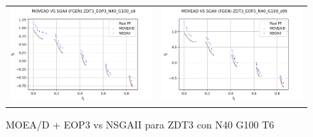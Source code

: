 \begin{figure}[H]
\begin{tabular}{c c}
    \includegraphics[scale=0.5]{figures/ZDT3_EOP3_N40_G100_T6/s9_comp.png} &
    \includegraphics[scale=0.5]{figures/ZDT3_EOP3_N40_G100_T6/s99_comp.png}\\
    \end{tabular}
    \caption{\centering MOEA/D + EOP3 vs NSGAII para ZDT3 con N40 G100 T6}
    \label{fig:13}
\end{figure}

